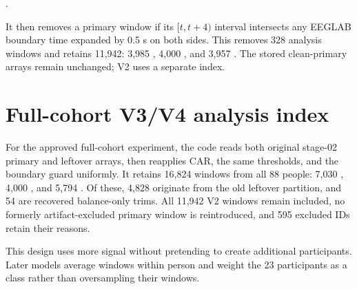 \begin{center}
.
\end{center}

It then removes a primary window if its $[t,t+4)$ interval intersects any
EEGLAB boundary time expanded by 0.5 s on both sides. This removes 328 analysis
windows and retains 11,942: 3,985 \AD{}, 4,000 \FTD{}, and 3,957 \CN{}.
The stored clean-primary arrays remain unchanged; V2 uses a separate index.

\section{Full-cohort V3/V4 analysis index}

For the approved full-cohort experiment, the code reads both original stage-02
primary and leftover arrays, then reapplies CAR, the same thresholds, and the
boundary guard uniformly. It retains 16,824 windows from all 88 people:
7,030 \AD{}, 4,000 \FTD{}, and 5,794 \CN{}. Of these, 4,828 originate from the
old leftover partition, and 54 are recovered balance-only trims. All 11,942 V2
windows remain included, no formerly artifact-excluded primary window is
reintroduced, and 595 excluded IDs retain their reasons.

This design uses more signal without pretending to create additional \FTD{}
participants. Later models average windows within person and weight the 23
\FTD{} participants as a class rather than oversampling their windows.
